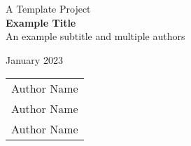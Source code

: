 \documentclass[a4paper,10pt]{report}
\newcommand\authorname{Author Name}
\begin{document}
\begin{titlepage}
    \centering
    \vspace*{3.5cm}
    \large{A Template Project}\\
    \huge\textbf{Example Title}\\
    \large{An example subtitle and multiple authors}

    \vfill

    January 2023\\
    \vspace{.25cm}
    \begin{tabular}{l}
        \large\authorname\\
        \large\authorname\\
        \large\authorname
    \end{tabular}
    \vspace{4.5cm}
\end{titlepage}


% 
\end{document}
